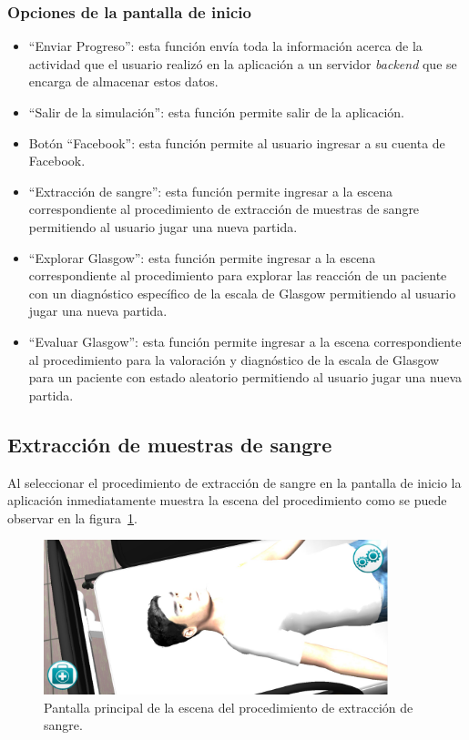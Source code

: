 \subsubsection{Opciones de la pantalla de inicio}

\begin{itemize}
\item \enquote{Enviar Progreso}: esta función envía toda la información
    acerca de la actividad que el usuario realizó en la aplicación a un servidor
    \emph{backend} que se encarga de almacenar estos datos.
\item \enquote{Salir de la simulación}: esta función permite salir de la
    aplicación.
\item Botón \enquote{Facebook}: esta función permite al usuario ingresar a su
    cuenta de Facebook.
\item \enquote{Extracción de sangre}: esta función permite ingresar a la
    escena correspondiente al procedimiento de extracción de muestras de sangre
    permitiendo al usuario jugar una nueva partida.
\item \enquote{Explorar Glasgow}: esta función permite ingresar a la
    escena correspondiente al procedimiento para explorar las reacción de un
    paciente con un diagnóstico específico de la escala de Glasgow permitiendo
    al usuario jugar una nueva partida.
\item \enquote{Evaluar Glasgow}: esta función permite ingresar a la escena
    correspondiente al procedimiento para la valoración y diagnóstico de la
    escala de Glasgow para un paciente con estado aleatorio permitiendo al
    usuario jugar una nueva partida.
\end{itemize}


\subsection{Extracción de muestras de sangre}

Al seleccionar el procedimiento de extracción de sangre en la pantalla de inicio 
la aplicación inmediatamente muestra la escena del procedimiento como se puede 
observar en la figura~\ref{fig:hemocultivo_principal}. 

\begin{figure}[H] 
\centering 
\includegraphics[width=10cm]{solucion/images/hemocultivo_principal.jpg}
\caption{Pantalla principal de la escena del procedimiento de extracción de sangre.}
\label{fig:hemocultivo_principal}
\end{figure}

